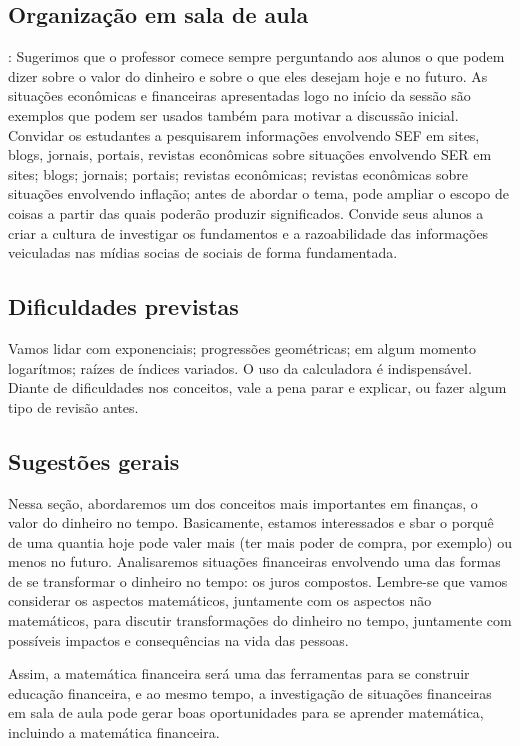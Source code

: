 \begin{paginatexto}
\subsection{Organização em sala de aula}: Sugerimos que o professor comece sempre perguntando aos alunos o que podem dizer sobre o valor do dinheiro e sobre o que eles desejam hoje e no futuro. As situações econômicas e financeiras apresentadas logo no início da sessão são exemplos que podem ser usados também para motivar a discussão inicial. Convidar os estudantes a pesquisarem informações envolvendo SEF em sites, blogs, jornais, portais, revistas econômicas sobre situações envolvendo SER em sites; blogs; jornais; portais; revistas econômicas; revistas econômicas sobre situações envolvendo inflação; antes de abordar o tema, pode ampliar o escopo de coisas a partir das quais poderão produzir significados. Convide seus alunos a criar a cultura de investigar os fundamentos e a razoabilidade das informações veiculadas nas mídias socias de sociais de forma fundamentada.

\subsection{Dificuldades previstas} Vamos lidar com exponenciais; progressões geométricas; em algum momento logarítmos; raízes de índices variados. O uso da calculadora é indispensável. Diante de dificuldades nos conceitos, vale a pena parar e explicar, ou fazer algum tipo de revisão antes.

\subsection{Sugestões gerais} Nessa seção, abordaremos um dos conceitos mais importantes em finanças, o valor do dinheiro no tempo. Basicamente, estamos interessados e sbar o porquê de uma quantia hoje pode valer mais (ter mais poder de compra, por exemplo) ou menos no futuro. Analisaremos situações financeiras envolvendo uma das formas de se transformar o dinheiro no tempo: os juros compostos. Lembre-se que vamos considerar os aspectos matemáticos, juntamente com os aspectos não matemáticos, para discutir transformações do dinheiro no tempo, juntamente com possíveis impactos e consequências na vida das pessoas.

Assim, a matemática financeira será uma das ferramentas para se construir educação financeira, e ao mesmo tempo, a investigação de situações financeiras em sala de aula pode gerar boas oportunidades para se aprender matemática, incluindo a matemática financeira.


\end{paginatexto}
